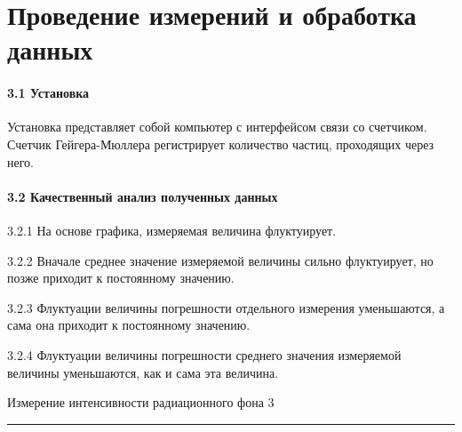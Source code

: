 \documentclass[12pt,a4paper]{scrartcl}
\begin{document}
	\section{Проведение измерений и обработка данных}
	
	\paragraph{3.1 Установка} \hfill
	
	\par Установка представляет собой компьютер с интерфейсом связи со счетчиком. Счетчик Гейгера-Мюллера регистрирует количество частиц, проходящих через него.
	
	\paragraph{3.2 Качественный анализ полученных данных} \hfill
	
	\par 3.2.1 На основе графика, измеряемая величина флуктуирует.
	\par 3.2.2 Вначале среднее значение измеряемой величины сильно флуктуирует, но позже приходит к постоянному значению.
	\par 3.2.3 Флуктуации величины погрешности отдельного измерения уменьшаются, а сама она приходит к постоянному значению.
	\par 3.2.4 Флуктуации величины погрешности среднего значения измеряемой величины уменьшаются, как и сама эта величина.
	
	\newpage
	\begin{flushleft}
		\footnotesize{Измерение интенсивности радиационного фона} \hspace{\fill} \footnotesize{3}
		\\[-0.3cm]\noindent\rule{\textwidth}{0.3pt}
	\end{flushleft}
	
\end{document}
